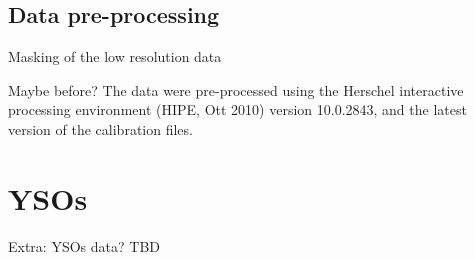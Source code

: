 



\subsection{Data pre-processing}
Masking of the low resolution data

Maybe before?
The data were pre-processed using the Herschel interactive processing environment (HIPE, Ott 2010) version 10.0.2843, and the latest version of the calibration files.

\section{YSOs}
Extra: YSOs data? TBD


